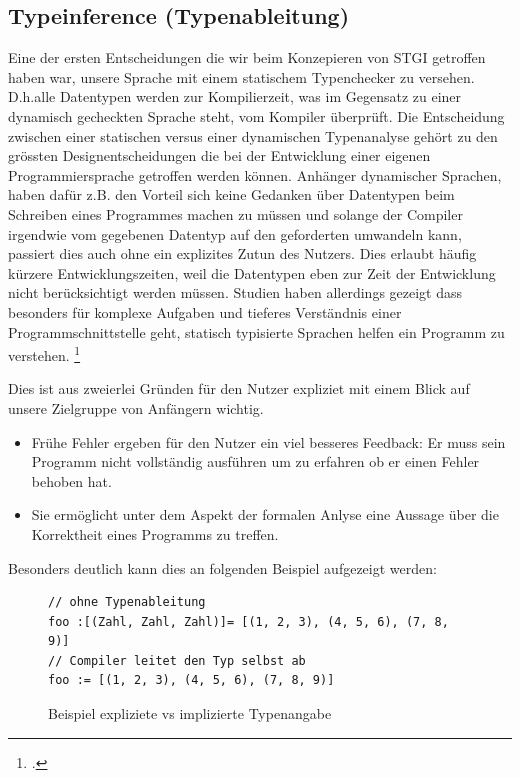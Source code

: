 \documentclass[a4paper, 12pt]{article}
\begin{document}
\subsection{Typeinference (Typenableitung)}
Eine der ersten Entscheidungen die wir beim Konzepieren von STGI getroffen
haben war, unsere Sprache mit einem statischem Typenchecker zu versehen.
D.h.alle Datentypen werden zur Kompilierzeit, was im Gegensatz zu einer
dynamisch gecheckten Sprache steht, vom Kompiler \"uberpr\"uft. Die Entscheidung zwischen einer statischen versus einer dynamischen Typenanalyse geh\"ort
zu den gr\"ossten Designentscheidungen die bei der Entwicklung einer eigenen
Programmiersprache getroffen werden k\"onnen. Anh\"anger dynamischer Sprachen, haben
daf\"ur z.B. den Vorteil sich keine Gedanken \"uber Datentypen beim Schreiben eines Programmes machen zu m\"ussen und solange der Compiler irgendwie vom gegebenen Datentyp auf den geforderten umwandeln kann, passiert dies auch ohne ein explizites Zutun des Nutzers. Dies erlaubt h\"aufig k\"urzere
Entwicklungszeiten, weil die Datentypen eben zur Zeit der Entwicklung nicht ber\"ucksichtigt werden m\"ussen.
Studien haben allerdings gezeigt dass besonders f\"ur komplexe Aufgaben und tieferes Verst\"andnis einer Programmschnittstelle geht, statisch typisierte Sprachen helfen ein Programm zu verstehen. \footcite[vgl.][694-695]{svd}

Dies ist aus zweierlei Gr\"unden f\"ur den Nutzer expliziet mit einem Blick auf
unsere Zielgruppe von Anf\"angern wichtig.
\begin{itemize}
\item{Fr\"uhe Fehler ergeben f\"ur den Nutzer ein viel besseres Feedback: Er
muss sein Programm nicht vollst\"andig ausf\"uhren um zu erfahren ob er
einen Fehler behoben hat.}
\item{Sie erm\"oglicht unter dem Aspekt der formalen Anlyse eine Aussage
\"uber die Korrektheit eines Programms zu treffen.}
\end{itemize}

Besonders deutlich kann dies an folgenden Beispiel aufgezeigt werden:
\begin{figure}[h]
\caption{Beispiel expliziete vs implizierte Typenangabe}
\begin{verbatim}
// ohne Typenableitung
foo :[(Zahl, Zahl, Zahl)]= [(1, 2, 3), (4, 5, 6), (7, 8, 9)]
// Compiler leitet den Typ selbst ab
foo := [(1, 2, 3), (4, 5, 6), (7, 8, 9)]
\end{verbatim}
\end{figure}
\end{document}
